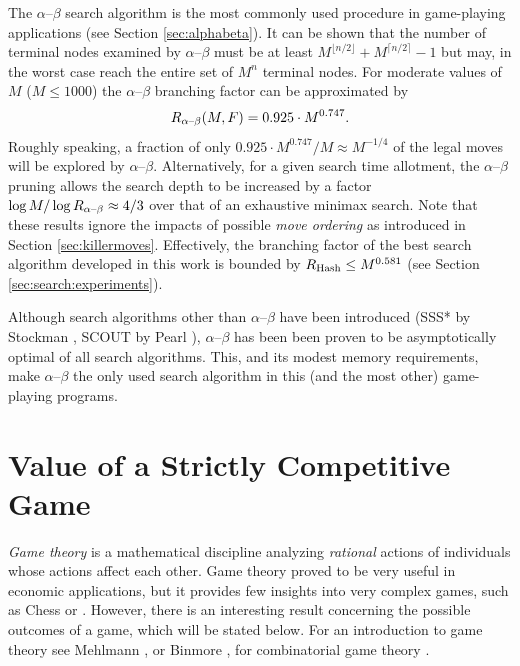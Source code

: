 The $\alpha$--$\beta$ search algorithm  is the most commonly used procedure in game-playing applications (see Section \ref{sec:alphabeta}). It can be shown that the number of terminal nodes examined by $\alpha$--$\beta$ must be at least $M^{\lfloor n/2 \rfloor} + M^{\lceil n/2 \rceil} -1$ but may, in the worst case reach the entire set of $M^n$ terminal nodes. For moderate values of $M$ ($M \leq 1000$) the $\alpha$--$\beta$ branching factor can be approximated by 
\begin{equation}
R_{\alpha\mbox{\scriptsize--}\beta}(M,F)= 0.925 \cdot M^{0.747}.
\end{equation}
Roughly speaking, a fraction of only $0.925 \cdot M^{0.747} / M \approx M^{-1/4}$ of the legal moves will be explored by $\alpha$--$\beta$. Alternatively, for a given search time allotment, the $\alpha$--$\beta$ pruning allows the search depth to be increased by a factor $\log M / \log R_{\alpha\mbox{\scriptsize--}\beta} \approx 4/3$ over that of an exhaustive minimax search. Note that these results ignore the impacts of possible \emph{move ordering} as introduced in Section \ref{sec:killermoves}. Effectively, the branching factor of the best search algorithm developed in this work is bounded by $R_{\mbox{\scriptsize Hash}} \leq M^{0.581}$ (see Section \ref{sec:search:experiments}).


Although search algorithms other than $\alpha$--$\beta$ have been introduced (SSS* by Stockman \cite{Stockman79}, SCOUT by Pearl \cite{Pearl84}), $\alpha$--$\beta$ has been been proven to be asymptotically optimal of all search algorithms. This, and its modest memory requirements, make $\alpha$--$\beta$ the only used search algorithm in this (and the most other) game-playing programs. 







\section{Value of a Strictly Competitive Game} \label{sec:gametheory}   
\emph{Game theory} is a mathematical discipline analyzing \emph{rational} actions of individuals whose actions affect each other. Game theory proved to be very useful in economic applications, but it provides few insights into very complex games, such as Chess or \Abalone. However, there is an interesting result concerning the possible outcomes of a game, which will be stated below. For an introduction to game theory see Mehlmann \cite{Mehlmann97}, or Binmore \cite{Binmore92}, for combinatorial game theory \cite{Berlekamp82}.

